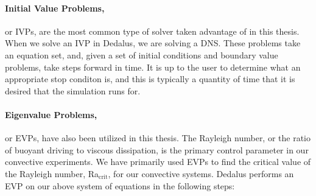 \paragraph{Initial Value Problems,} or IVPs, are the most common type of solver taken advantage of in this thesis.
When we solve an IVP in Dedalus, we are solving a DNS.
These problems take an equation set, and, given a set of initial conditions and boundary value problems, take steps forward in time.
It is up to the user to determine what an appropriate stop conditon is, and this is typically a quantity of time that it is desired that the simulation runs for.

\paragraph{Eigenvalue Problems,} or EVPs, have also been utilized in this thesis.
The Rayleigh number, or the ratio of buoyant driving to viscous dissipation, is the primary control parameter in our convective experiments.
We have primarily used EVPs to find the critical value of the Rayleigh number, Ra$_{\text{crit}}$, for our convective systems.
Dedalus performs an EVP on our above system of equations in the following steps:
